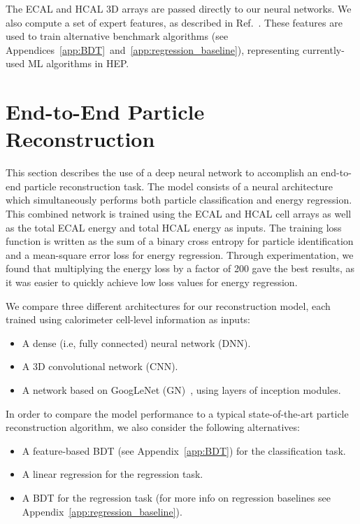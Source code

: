 The ECAL and HCAL 3D arrays are passed directly to our neural networks. We also compute a set of expert features, as described in Ref.~\cite{NIPS}. These features are used to train alternative benchmark algorithms (see Appendices~\ref{app:BDT}~and~\ref{app:regression_baseline}), representing currently-used ML algorithms in HEP.

\chapter{End-to-End Particle Reconstruction}
\label{sec:reco}

This section describes the use of a deep neural network to accomplish an end-to-end particle reconstruction task. The model consists of a neural architecture which simultaneously performs both particle classification and energy regression. This combined network is trained using the ECAL and HCAL cell arrays as well as the total ECAL energy and total HCAL energy as inputs. The training loss function is written as the sum of a binary cross entropy for particle identification and a mean-square error loss for energy regression. Through experimentation, we found that multiplying the energy loss by a factor of 200 gave the best results, as it was easier to quickly achieve low loss values for energy regression.

We compare three different architectures for our reconstruction model, each trained using calorimeter cell-level information as inputs:
\begin{itemize}
\item A dense (i.e, fully connected) neural network (DNN).
\item A 3D convolutional network (CNN).
\item A network based on GoogLeNet (GN)~\cite{GoogLeNet}, using layers of inception modules.
\end{itemize}

In order to compare the model performance to a typical state-of-the-art particle reconstruction algorithm, we also consider the following alternatives:
\begin{itemize}
    \item A feature-based BDT (see Appendix~\ref{app:BDT}) for the classification task.
    \item A linear regression for the regression task.
    \item A BDT for the regression task (for more info on regression baselines see Appendix~\ref{app:regression_baseline}).
\end{itemize}

